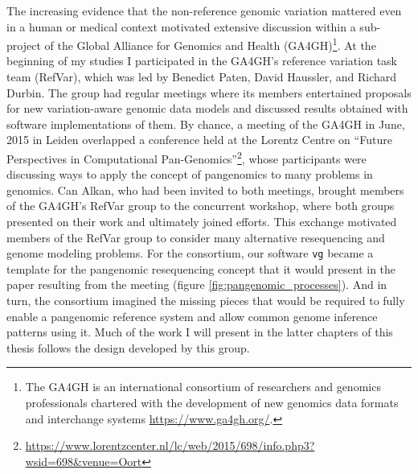The increasing evidence that the non-reference genomic variation mattered even in a human or medical context motivated extensive discussion within a sub-project of the Global Alliance for Genomics and Health (GA4GH)\footnote{The GA4GH is an international consortium of researchers and genomics professionals chartered with the development of new genomics data formats and interchange systems \url{https://www.ga4gh.org/}.}.
At the beginning of my studies I participated in the GA4GH's reference variation task team (RefVar), which was led by Benedict Paten, David Haussler, and Richard Durbin.
The group had regular meetings where its members entertained proposals for new variation-aware genomic data models and discussed results obtained with software implementations of them.
By chance, a meeting of the GA4GH in June, 2015 in Leiden overlapped a conference held at the Lorentz Centre on ``Future Perspectives in Computational Pan-Genomics''\footnote{\url{https://www.lorentzcenter.nl/lc/web/2015/698/info.php3?wsid=698\&venue=Oort}}, whose participants were discussing ways to apply the concept of pangenomics to many problems in genomics.
Can Alkan, who had been invited to both meetings, brought members of the GA4GH's RefVar group to the concurrent workshop, where both groups presented on their work and ultimately joined efforts.
This exchange motivated members of the RefVar group to consider many alternative resequencing and genome modeling problems.
For the consortium, our software {\tt vg} became a template for the pangenomic resequencing concept that it would present in the paper resulting from the meeting \cite{computational2016computational} (figure \ref{fig:pangenomic_processes}).
And in turn, the consortium imagined the missing pieces that would be required to fully enable a pangenomic reference system and allow common genome inference patterns using it.
Much of the work I will present in the latter chapters of this thesis follows the design developed by this group.

